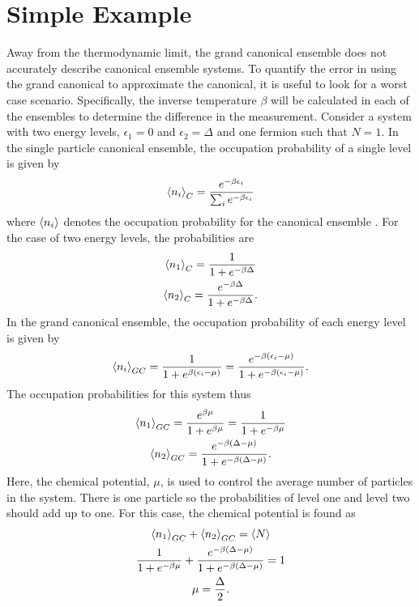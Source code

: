 \section{Simple Example}
Away from the thermodynamic limit, the grand canonical ensemble does not accurately describe canonical ensemble systems. To quantify the error in using the grand canonical to approximate the canonical, it is useful to look for a worst case scenario.
Specifically, the inverse temperature $\beta$ will be calculated in each of the ensembles to determine the difference in the measurement. Consider a system with two energy levels, $\epsilon_1=0$ and $\epsilon_2=\Delta$ and one fermion such that $N=1$. In the single particle canonical ensemble, the occupation probability of a single level is given by
\begin{equation}
    \left<{n_i}\right>_C=\frac{e^{-\beta\epsilon_i}}{\sum_i e^{-\beta\epsilon_i}}
\end{equation}
where $\left<{n_i}\right>$ denotes the occupation probability for the canonical ensemble \cite{Kardar}. 
For the case of two energy levels, the probabilities are 
\begin{gather}
    \left<{n_1}\right>_C=\frac{1}{1+e^{-\beta\Delta}}\\
    \left<{n_2}\right>_C=\frac{e^{-\beta\Delta}}{1+e^{-\beta\Delta}}.
\end{gather}
In the grand canonical ensemble, the occupation probability of each energy level is given by 
\begin{equation}
    \left<{n_i}\right>_{GC}=\frac{1}{1+e^{\beta(\epsilon_i-\mu)}}=\frac{e^{-\beta(\epsilon_i-\mu )}}{1+e^{-\beta(\epsilon_i-\mu)}}. \label{GCoccprobab}
\end{equation}
The occupation probabilities for this system thus 
\begin{gather}
    \left<{n_1}\right>_{GC}=\frac{e^{\beta\mu}}{1+e^{\beta\mu}}=\frac{1}{1+e^{-\beta\mu}}\\
    \left<{n_2}\right>_{GC}=\frac{e^{-\beta(\Delta-\mu)}}{1+ e^{-\beta(\Delta-\mu)}}.
\end{gather}
Here, the chemical potential, $\mu$, is used to control the average number of particles in the system. There is one particle so the probabilities of level one and level two should add up to one. For this case, the chemical potential is found as 
\begin{gather}
    \left<{n_1}\right>_{GC}+\left<{n_2}\right>_{GC}=\left<{N}\right>\nonumber\\
    \frac{1}{1+e^{-\beta\mu}}+\frac{e^{-\beta(\Delta-\mu)}}{1+e^{-\beta(\Delta-\mu)}}=1\nonumber\\
    \mu=\frac{\Delta}{2}.
\end{gather}
